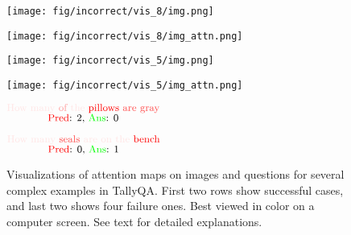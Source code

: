 \documentclass{article} \usepackage[dvipsnames,table]{xcolor}
\begin{document}
\begin{figure}[t]
\centering
    \begin{minipage}[t]{0.47\linewidth}
        \begin{minipage}{0.47\linewidth}
            \centering
            \texttt{[image: fig/incorrect/vis\_8/img.png]}
        \end{minipage}
        \begin{minipage}{0.47\linewidth}
            \centering
            \texttt{[image: fig/incorrect/vis\_8/img\_attn.png]}
        \end{minipage}
    \end{minipage}
    \begin{minipage}[t]{0.47\linewidth}
        \begin{minipage}{0.47\linewidth}
            \centering
            \texttt{[image: fig/incorrect/vis\_5/img.png]}
        \end{minipage}
        \begin{minipage}{0.47\linewidth}
            \centering
            \texttt{[image: fig/incorrect/vis\_5/img\_attn.png]}
        \end{minipage}
    \end{minipage}
    
    \centering
    \begin{minipage}[t]{0.47\linewidth}
        \centering
        $\substack{
            \text{\small {\color[rgb]{1,0.9,0.9}How many} {\color[rgb]{1,0.6,0.6}of} {\color[rgb]{1,0.9,0.9}the} {\color[rgb]{1,0,0}pillows} {\color[rgb]{1,0.3,0.3}are gray}} \\
            \text{\small {{\color[rgb]{1,0,0}Pred}: 2, {\color[rgb]{0,1,0}Ans}: 0}}
            }$
    \end{minipage}
    \begin{minipage}[t]{0.47\linewidth}
        \centering
        $\substack{
            \text{\small {\color[rgb]{1,0.9,0.9}How many} {\color[rgb]{1,0.3,0.3}seals} {\color[rgb]{1,0.9,0.9}are on the} {\color[rgb]{1,0,0}bench}} \\
            \text{\small {{\color[rgb]{1,0,0}Pred}: 0, {\color[rgb]{0,1,0}Ans}: 1}}
            }$
    \end{minipage}
\caption{Visualizations of attention maps on images and questions for several complex examples in TallyQA. First two rows show successful cases, and last two shows four failure ones. Best viewed in color on a computer screen. See text for detailed explanations. \label{fig:visualization}}
\end{figure}
\end{document}
